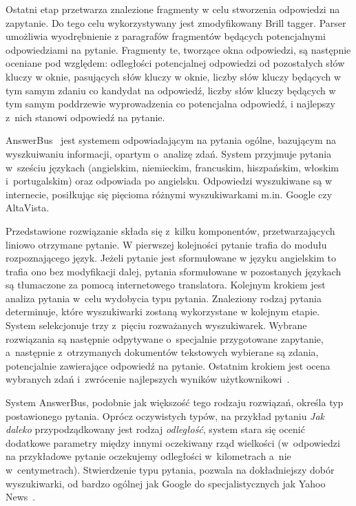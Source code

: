 Ostatni etap przetwarza znalezione fragmenty w celu stworzenia odpowiedzi na zapytanie. Do tego celu wykorzystywany jest zmodyfikowany Brill tagger. Parser umożliwia wyodrębnienie z paragrafów fragmentów będących potencjalnymi odpowiedziami na pytanie. Fragmenty te, tworzące okna odpowiedzi, są następnie oceniane pod względem:  odległości potencjalnej odpowiedzi od pozostałych słów kluczy w oknie, pasujących słów kluczy w oknie, liczby słów kluczy będących w tym samym zdaniu co kandydat na odpowiedź, liczby słów kluczy będących w tym samym poddrzewie wyprowadzenia co potencjalna odpowiedź, i najlepszy z~nich stanowi odpowiedź na pytanie\cite{moldovan-etal-2000-structure}.

AnswerBus~\cite{zheng2002answerbus} jest systemem odpowiadającym na pytania ogólne, bazującym na wyszkuiwaniu informacji, opartym o~analizę zdań. System przyjmuje pytania w~sześciu językach (angielskim, niemieckim, francuskim, hiszpańskim, włoskim i~portugalskim) oraz odpowiada po angielsku. Odpowiedzi wyszukiwane są w~ internecie, posiłkując się pięcioma różnymi wyszukiwarkami m.in. Google czy AltaVista.

Przedstawione rozwiązanie składa się z~kilku komponentów, przetwarzających liniowo otrzymane pytanie. W pierwszej kolejności pytanie trafia do modułu rozpoznającego język. Jeżeli pytanie jest sformułowane w języku angielskim to trafia ono bez modyfikacji dalej, pytania sformułowane w pozostanych językach są tłumaczone za pomocą internetowego translatora. Kolejnym krokiem jest analiza pytania w~celu wydobycia typu pytania. Znaleziony rodzaj pytania determinuje, które wyszukiwarki zostaną wykorzystane w kolejnym etapie. System selekcjonuje trzy z~pięciu rozważanych wyszukiwarek. Wybrane rozwiązania są następnie odpytywane o~specjalnie przygotowane zapytanie, a~następnie z~otrzymanych dokumentów tekstowych wybierane są zdania, potencjalnie zawierające odpowiedź na pytanie. Ostatnim krokiem jest ocena wybranych zdań i~zwrócenie najlepszych wyników użytkownikowi~\cite{zheng2002answerbus}.  

System AnswerBus, podobnie jak większość tego rodzaju rozwiązań, określa typ postawionego pytania. Oprócz oczywistych typów, na przykład pytaniu \emph{Jak daleko} przypodządkowany jest rodzaj \emph{odległość}, system stara się ocenić dodatkowe parametry między innymi oczekiwany rząd wielkości (w~odpowiedzi na przykładowe pytanie oczekujemy odległości w~kilometrach a~nie w~centymetrach). Stwierdzenie typu pytania, pozwala na dokładniejszy dobór wyszukiwarki, od bardzo ogólnej jak Google do specjalistycznych jak Yahoo News~\cite{zheng2002answerbus}.

